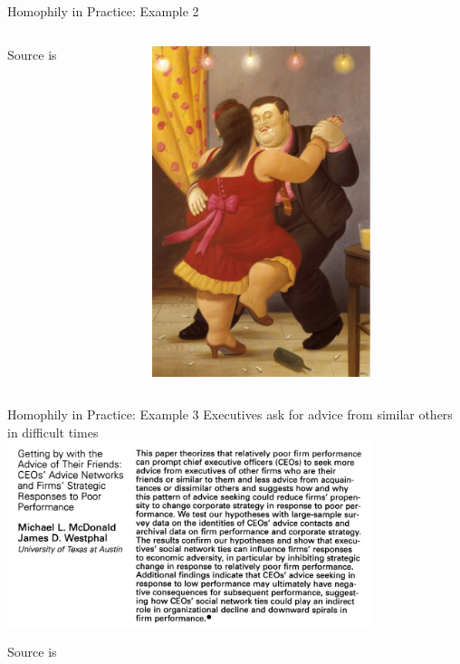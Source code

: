 \documentclass[notes, aspectratio=1610]{beamer}
\begin{document}
\begin{frame}{Homophily in Practice: Example 2}
\begin{columns}[t]
\begin{column}{0.5\textwidth}
			\footnotesize
			Source is \cite{mcfarland2013}
		\end{column}
		\begin{column}{0.5\textwidth}
			\centering
			\includegraphics[width=0.7\textwidth]{images/romantic_relation.jpg}
		\end{column}
	\end{columns}
\end{frame}

\begin{frame}{Homophily in Practice: Example 3}
	{Executives ask for advice from similar others in difficult times}
	\centering
	\includegraphics[width=0.8\textwidth]{images/mcdonald_westphal.png}

	\footnotesize
	Source is \cite{mcdonald2013}
\end{frame}
\end{document}
